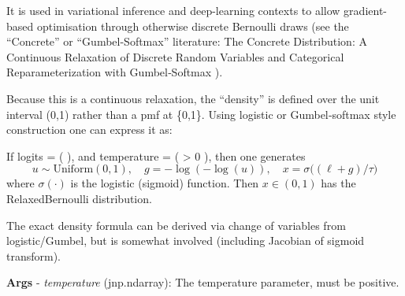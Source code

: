 \documentclass[
  letterpaper,
  DIV=11,
  numbers=noendperiod]{scrartcl}
\begin{document}
It is used in variational inference and deep-learning contexts to allow
gradient-based optimisation through otherwise discrete Bernoulli draws
(see the ``Concrete'' or ``Gumbel-Softmax'' literature: The Concrete
Distribution: A Continuous Relaxation of Discrete Random Variables and
Categorical Reparameterization with Gumbel‑Softmax ).

Because this is a continuous relaxation, the ``density'' is defined over
the unit interval (0,1) rather than a pmf at \{0,1\}. Using logistic or
Gumbel‐softmax style construction one can express it as:

If logits = ( \ell ), and temperature = ( \tau \textgreater{} 0 ), then
one generates \[
u \sim \mathrm{Uniform}(0,1),\quad
g = -\log(-\log(u)),\quad
x = \sigma\big((\ell + g)/\tau\big)
\] where \(\sigma(\cdot)\) is the logistic (sigmoid) function. Then
\(x \in (0,1)\) has the RelaxedBernoulli distribution.

The exact density formula can be derived via change of variables from
logistic/Gumbel, but is somewhat involved (including Jacobian of sigmoid
transform).

\textbf{Args} - \emph{temperature} (jnp.ndarray): The temperature
parameter, must be positive.
\end{document}
